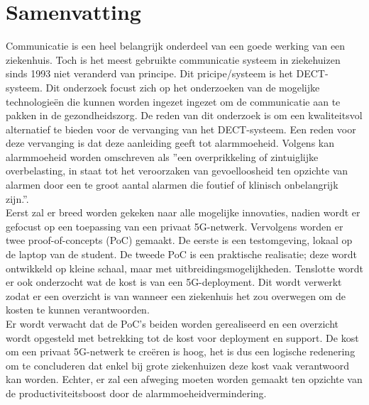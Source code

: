 \documentclass[dutch,dit,thesis]{hogentreport}
\begin{document}
\section*{Samenvatting}
Communicatie is een heel belangrijk onderdeel van een goede werking van een ziekenhuis. Toch is het meest gebruikte communicatie systeem in ziekehuizen sinds 1993 niet veranderd van principe. Dit pricipe/systeem is het DECT-systeem. Dit onderzoek focust zich op het onderzoeken van de mogelijke technologieën die kunnen worden ingezet ingezet om de communicatie aan te pakken in de gezondheidszorg. De reden van dit onderzoek is om een kwaliteitsvol alternatief te bieden voor de vervanging van het DECT-systeem. Een reden voor deze vervanging is dat deze aanleiding geeft tot alarmmoeheid.
    Volgens \textcite{Ferrara2023} kan alarmmoeheid worden omschreven als ''een overprikkeling of zintuiglijke overbelasting, in staat tot het veroorzaken van gevoelloosheid ten opzichte van alarmen door een te groot aantal alarmen die foutief of klinisch onbelangrijk zijn.''.\\ Eerst zal er breed worden gekeken naar alle mogelijke innovaties, nadien wordt er gefocust op een toepassing van een privaat 5G-netwerk. 
    Vervolgens worden er twee proof-of-concepts (PoC) gemaakt. De eerste is een testomgeving, lokaal op de laptop van de student. De tweede PoC is een praktische realisatie; deze wordt ontwikkeld op kleine schaal, maar met uitbreidingsmogelijkheden. Tenslotte wordt er ook onderzocht wat de kost is van een 5G-deployment. Dit wordt verwerkt zodat er een overzicht is van wanneer een ziekenhuis het zou overwegen om de kosten te kunnen verantwoorden.\\
    Er wordt verwacht dat de PoC's beiden worden gerealiseerd en een overzicht wordt opgesteld met betrekking tot de kost voor deployment en support. De kost om een privaat 5G-netwerk te creëren is hoog, het is dus een logische redenering om te concluderen dat enkel bij grote ziekenhuizen deze kost vaak verantwoord kan worden. Echter, er zal een afweging moeten worden gemaakt ten opzichte van de productiviteitsboost door de alarmmoeheidvermindering.




%
\end{document}
